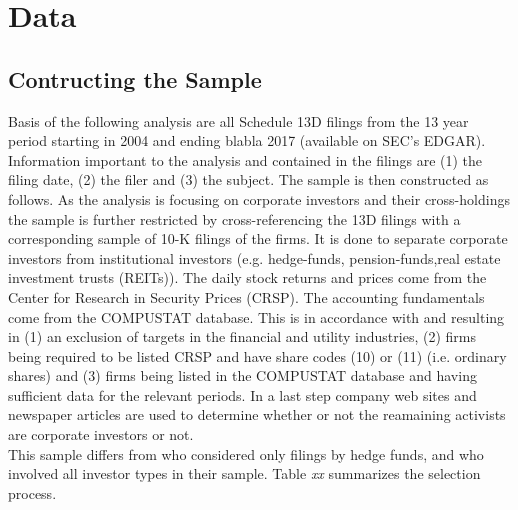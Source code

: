 \documentclass[12pt]{article}
\begin{document}
\section{Data}
\subsection{Contructing the Sample}
Basis of the following analysis are all Schedule 13D filings from the 13 year period starting in 2004 and ending blabla 2017 (available on SEC's EDGAR).
Information important to the analysis and contained in the filings are (1) the filing date, (2) the filer and (3) the subject. The sample is then constructed as follows. As the analysis is focusing on corporate investors and their cross-holdings the sample is further restricted by cross-referencing the 13D filings with a corresponding sample of 10-K filings of the firms. It is done to separate corporate investors from institutional investors (e.g. hedge-funds, pension-funds,real estate investment trusts (REITs)). 
The daily stock returns and prices come from the Center for Research in Security Prices (CRSP). The accounting fundamentals come from the COMPUSTAT database. This is in accordance with \citet{Fama2006} and \citet{Brigida2012} resulting in (1) an exclusion of targets in the financial and utility industries, (2) firms being required to be listed CRSP and have share codes (10) or (11) (i.e. ordinary shares) and (3)  firms being listed in the COMPUSTAT database and having sufficient data for the relevant periods. In a last step company web sites and newspaper articles are used to determine whether or not the reamaining activists are corporate investors or not.\\
This sample differs from \citet{Brav2008} who considered only filings by hedge funds, and \citet{Collin-Dufresne2015} who involved all investor types in their sample. Table \emph{xx} summarizes the selection process. %
\end{document}
